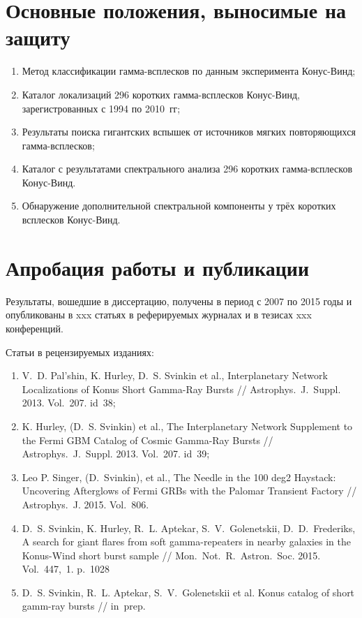 \section{Основные положения, выносимые на защиту}
\begin{enumerate}
\item Метод классификации гамма-всплесков по данным эксперимента Конус-Винд;
\item Каталог локализаций 296 коротких гамма-всплесков Конус-Винд, 
  зарегистрованных с 1994 по 2010~гг;
\item Результаты поиска гигантских вспышек от источников мягких повторяющихся гамма-всплесков;
\item Каталог с результатами спектрального анализа 296 коротких гамма-всплесков Конус-Винд.
\item Обнаружение дополнительной спектральной компоненты у трёх коротких всплесков Конус-Винд.
\end{enumerate}

\section{Апробация работы и публикации}
Результаты, вошедшие в диссертацию, получены в период с 2007 по 2015
годы и опубликованы в xxx статьях в реферируемых журналах и в тезисах xxx конференций. 

Статьи в рецензируемых изданиях:
\begin{enumerate}
\item V.~D. Pal'shin, K. Hurley, D.~S. Svinkin et al., Interplanetary Network Localizations of
Konus Short Gamma-Ray Bursts // Astrophys.~J.~Suppl. 2013. Vol.~207. id~38;
\item K. Hurley, (D.~S. Svinkin) et al., The Interplanetary Network Supplement to 
the Fermi GBM Catalog of Cosmic Gamma-Ray Bursts // Astrophys.~J.~Suppl. 2013. Vol.~207. id~39;
\item Leo P. Singer, (D.~Svinkin), et al., The Needle in the 100 deg2 Haystack: 
Uncovering Afterglows of Fermi GRBs with the Palomar Transient Factory // 
Astrophys.~J. 2015. Vol.~806.
\item D.~S. Svinkin, K. Hurley, R.~L. Aptekar, S.~V.~Golenetskii, D.~D.~Frederiks, 
A search for giant flares from soft gamma-repeaters in nearby galaxies in the 
Konus-Wind short burst sample // Mon.~Not.~R.~Astron.~Soc. 2015. Vol.~447,~1. p.~1028
\item D.~S. Svinkin, R.~L. Aptekar, S.~V.~Golenetskii et al. 
Konus catalog of short gamm-ray bursts // in~prep.
\end{enumerate}

